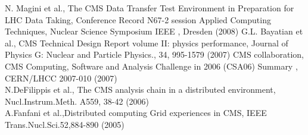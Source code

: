 \begin{thebibliography}{}
%
 N. Magini et al., The CMS Data Transfer Test Environment in Preparation for LHC Data Taking, Conference Record N67-2 session Applied Computing Techniques, Nuclear Science Symposium IEEE , Dresden (2008)
%
 G.L. Bayatian et al., CMS Technical Design Report volume II: physics performance, Journal of Physics G: Nuclear and Particle Physics., 34, 995-1579 (2007)
%
CMS collaboration,  CMS Computing, Software and Analysis Challenge in 2006 (CSA06) Summary , %
CERN/LHCC 2007-010 (2007) \\
N.DeFilippis et al., The CMS analysis chain in a distributed environment, Nucl.Instrum.Meth. A559, 38-42 (2006) \\
A.Fanfani et al.,Distributed computing Grid experiences in CMS, IEEE Trans.Nucl.Sci.52,884-890 (2005)
\end{thebibliography}



